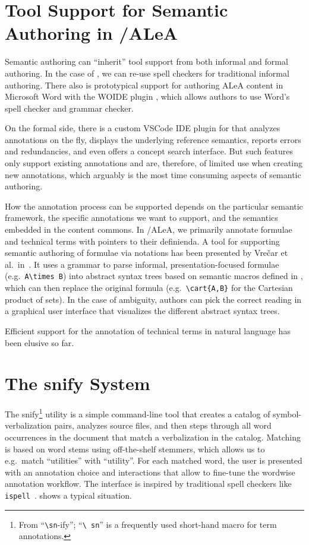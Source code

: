 \documentclass[runningheads]{llncs}
\newcommand\ALeA{\textsf{ALeA}\xspace}
\newcommand\snify{\textsf{snify}\xspace}
\newcommand\WOIDE{\textsf{WOIDE}\xspace}
\begin{document}
\section{Tool Support for Semantic Authoring in \sTeX/\ALeA}\label{sec:tools}

Semantic authoring can ``inherit'' tool support from both informal and formal authoring.
In the case of \sTeX, we can re-use spell checkers for traditional informal authoring.
There also is prototypical support for authoring \ALeA content in Microsoft Word with
the \WOIDE plugin \cite{KohKoh:woide24}, which allows authors to use Word's spell
checker and grammar checker.

On the formal side, there is a custom VSCode IDE plugin for \sTeX \cite{sTeX-IDE:git} that
analyzes annotations on the fly, displays the underlying reference semantics, reports
errors and redundancies, and even offers a concept search interface.  But such features
only support existing annotations and are, therefore, of limited use when creating new
annotations, which arguably is the most time consuming aspects of semantic authoring.

How the annotation process can be supported depends on the particular semantic framework,
the specific annotations we want to support, and the semantics embedded in the content
commons.  In \sTeX/\ALeA, we primarily annotate formulae and technical terms with pointers
to their definienda.  A tool for supporting semantic authoring of formulae via notations
has been presented by Vre{\v{c}}ar et al.\ in~\cite{VreWelKam:tsmmdui24}.  It uses a
grammar to parse informal, presentation-focused formulae (e.g.\
\lstinline[keywordstyle={}]|A\times B|) into abstract syntax trees based on semantic
macros defined in \sTeX, which can then replace the original formula (e.g.\
\lstinline|\cart{A,B}| for the Cartesian product of sets).  In the case of ambiguity,
authors can pick the correct reading in a graphical user interface that visualizes the
different abstract syntax trees.

Efficient support for the annotation of technical terms in natural language
has been elusive so far.


\section{The \snify System}\label{sec:snify}

The \snify\footnote{ From ``\texttt{\textbackslash sn}-ify''; ``\texttt{\textbackslash
    sn}'' is a frequently used \sTeX short-hand macro for term annotations.}  utility
\cite{stextools:git} is a simple command-line tool that creates a catalog of
symbol-verbalization pairs, analyzes \sTeX source files, and then steps through all word
occurrences in the document that match a verbalization in the catalog.  Matching is based
on word stems using off-the-shelf stemmers, which allows us to e.g.\ match ``utilities''
with ``utility''.  For each matched word, the user is presented with an annotation choice
and interactions that allow to fine-tune the wordwise annotation workflow.  The interface
is inspired by traditional spell checkers like \lstinline|ispell|~\cite{ispellman}.   shows
a typical situation.
\end{document}
